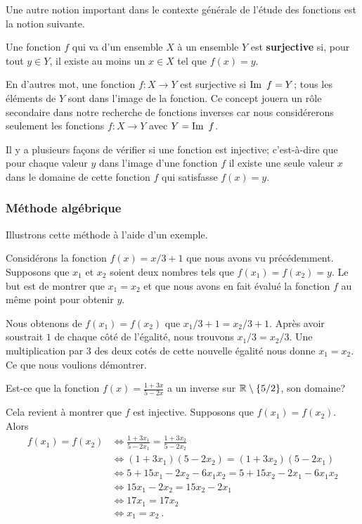 {Une autre notion important dans le contexte générale de l'étude des
fonctions est la notion suivante.

\begin{defn} 
Une fonction $f$ qui va d'un ensemble $X$ à un ensemble $Y$ est
{\bfseries surjective} si, pour tout
$y \in Y$, il existe au moins un $x \in X$ tel que $f(x) = y$.
\end{defn}

En d'autres mot, une fonction $f: X \to Y$ est surjective si
$\IM f = Y$; tous les éléments de $Y$ sont dans l'image de la fonction.
Ce concept jouera un rôle secondaire dans notre recherche de
fonctions inverses car nous considérerons seulement les fonctions
$f : X \to Y$ avec $Y = \IM f$.

Il y a plusieurs façons de vérifier si une fonction est injective;
c'est-à-dire que pour chaque valeur $y$ dans l'image d'une fonction
$f$ il existe une seule valeur $x$ dans le domaine de cette fonction
$f$ qui satisfasse $f(x) = y$.

\subsubsection{Méthode algébrique}

Illustrons cette méthode à l'aide d'un exemple.

\begin{egg}
Considérons la fonction $f(x) = x/3 +1$ que nous avons vu précédemment.
Supposons que $x_1$ et $x_2$ soient deux nombres tels que
$f(x_1) = f(x_2) = y$.  Le but est de montrer que $x_1 = x_2$ et que
nous avons en fait évalué la fonction $f$ au même point pour obtenir
$y$.

Nous obtenons de $f(x_1) = f(x_2)$ que $x_1/3  + 1 = x_2/3 +1$.
Après avoir soustrait $1$ de chaque côté de l'égalité, nous trouvons
$x_1/3 = x_2/3$.  Une multiplication par $3$ des deux cotés de cette
nouvelle égalité nous donne $x_1 = x_2$.  Ce que nous voulions
démontrer.
\end{egg}

\begin{egg}
Est-ce que la fonction $\displaystyle f(x) = \frac{1+3x}{5-2x}$ a un
inverse sur $\mathbb{R} \setminus \{5/2\}$, son domaine?

Cela revient à montrer que $f$ est injective.  Supposons que
$f(x_1) = f(x_2)$.  Alors
\begin{align*}
f(x_1) = f(x_2) & \Leftrightarrow \frac{1+3x_1}{5-2x_1}
= \frac{1+3x_2}{5-2x_2} \\
&\Leftrightarrow (1+3x_1)(5-2x_2) = (1+3x_2)(5-2x_1) \\
&\Leftrightarrow 5+15x_1-2x_2 -6 x_1x_2 = 5+ 15 x_2 -2x_1 - 6x_1 x_2 \\
&\Leftrightarrow 15x_1-2x_2= 15 x_2 -2x_1 \\
&\Leftrightarrow 17x_1 = 17 x_2 \\
&\Leftrightarrow x_1 = x_2  \ .
\end{align*}
\label{invEGG}
\end{egg}

}
